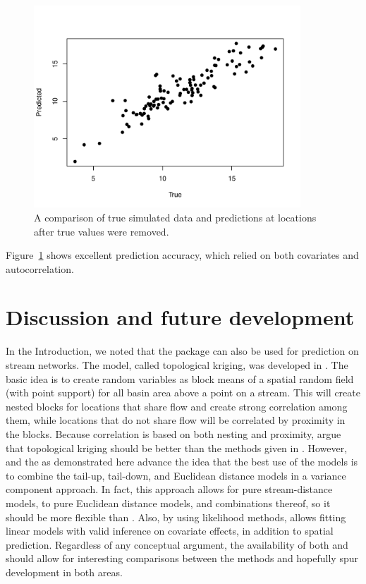 \documentclass[nojss]{jss}
\begin{document}
\begin{figure}
  \begin{center}
    \includegraphics[keepaspectratio=true, width = 100mm]{Figures/jss984Fig-SimTvP}
    \caption{A comparison of true simulated data and predictions at
      locations after true values were removed.\label{SimTrueVsPred}}
  \end{center}
\end{figure}
Figure~\ref{SimTrueVsPred} shows excellent prediction accuracy, which
relied on both covariates and autocorrelation.


%
%

\section{Discussion and future development}\label{FutureDev}

In the Introduction, we noted that the  package can also be used for prediction on stream networks. The model, called topological kriging, was developed in \citet{Skoi:Merz:Blos:top:2006}.  The basic idea is to create random variables as block means of a spatial random field (with point support) for all basin area above a point on a stream.  This will create nested blocks for locations that share flow and create strong correlation among them, while locations that do not share flow will be correlated by proximity in the blocks.  Because correlation is based on both nesting and proximity, \citet{Laah:Skoi:Blos:comp:2012} argue that topological kriging should be better than the methods given in .  However, \citet{Ver:Pete:Move:2010} and the  as demonstrated here advance the idea that the best use of the models is to combine the tail-up, tail-down, and Euclidean distance models in a variance component approach. In fact, this approach allows for pure stream-distance models, to pure Euclidean distance models, and combinations thereof, so it should be more flexible than .  Also, by using likelihood methods,  allows fitting linear models with valid inference on covariate effects, in addition to spatial prediction.  Regardless of any conceptual argument, the availability of both  and  should allow for interesting comparisons between the methods and hopefully spur development in both areas.
\end{document}
